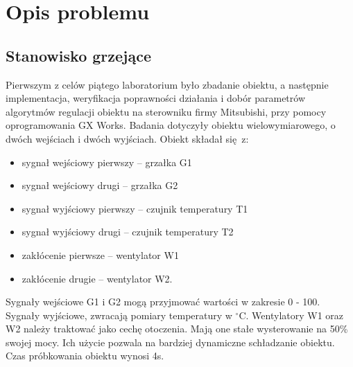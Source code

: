 \chapter{Opis problemu}
\section{Stanowisko grzejące}
Pierwszym z celów piątego laboratorium było zbadanie obiektu, a następnie
implementacja, weryfikacja poprawności działania i dobór parametrów algorytmów
regulacji obiektu na sterowniku firmy Mitsubishi, przy pomocy oprogramowania
GX Works.
Badania dotyczyły obiektu wielowymiarowego, o dwóch wejściach
i dwóch wyjściach. Obiekt składał się z:
\begin{itemize}
  \item sygnał wejściowy pierwszy -- grzałka G1
  \item sygnał wejściowy drugi -- grzałka G2
  \item sygnał wyjściowy pierwszy -- czujnik temperatury T1
  \item sygnał wyjściowy drugi -- czujnik temperatury T2
  \item zakłócenie pierwsze -- wentylator W1
  \item zakłócenie drugie -- wentylator W2.
\end{itemize}
Sygnały wejściowe G1 i G2 mogą przyjmować wartości w zakresie 0 - 100.
Sygnały wyjściowe, zwracają pomiary temperatury w $^\circ$C. Wentylatory
W1 oraz W2 należy traktować jako cechę otoczenia. Mają one stałe wysterowanie
na 50\% swojej mocy. Ich użycie pozwala na bardziej dynamiczne schładzanie
obiektu. Czas próbkowania obiektu wynosi 4s.
